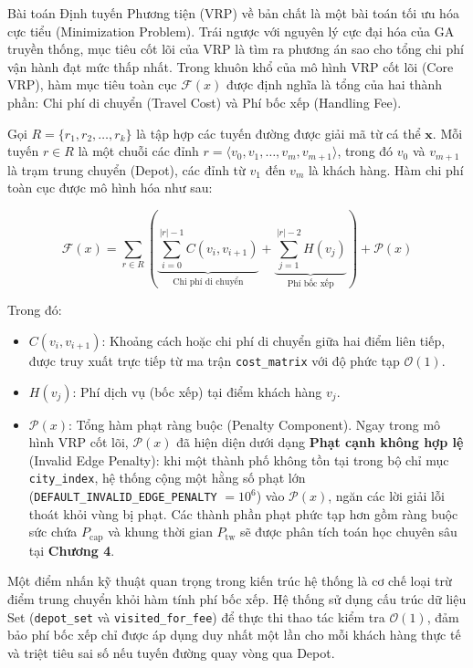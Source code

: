 \documentclass[12pt,a4paper]{article}
\numberwithin{figure}{subsection}
\begin{document}
Bài toán Định tuyến Phương tiện (VRP) về bản chất là một bài toán tối ưu hóa cực tiểu (Minimization Problem). Trái ngược với nguyên lý cực đại hóa của GA truyền thống, mục tiêu cốt lõi của VRP là tìm ra phương án sao cho tổng chi phí vận hành đạt mức thấp nhất. Trong khuôn khổ của mô hình VRP cốt lõi (Core VRP), hàm mục tiêu toàn cục $\mathcal{F}(x)$ được định nghĩa là tổng của hai thành phần: Chi phí di chuyển (Travel Cost) và Phí bốc xếp (Handling Fee).

Gọi $R = \{r_1, r_2, \dots, r_k\}$ là tập hợp các tuyến đường được giải mã từ cá thể $\textbf{x}$. Mỗi tuyến $r \in R$ là một chuỗi các đỉnh $r = \langle v_0, v_1, \dots, v_m, v_{m+1} \rangle$, trong đó $v_0$ và $v_{m+1}$ là trạm trung chuyển (Depot), các đỉnh từ $v_1$ đến $v_m$ là khách hàng. Hàm chi phí toàn cục được mô hình hóa như sau:

\[ \mathcal{F}(x) = \sum_{r \in R} \left( \underbrace{\sum_{i=0}^{|r|-1} C(v_i, v_{i+1})}_{\text{Chi phí di chuyển}} + \underbrace{\sum_{j=1}^{|r|-2} H(v_j)}_{\text{Phí bốc xếp}} \right) + \mathcal{P}(x) \]

Trong đó:
\begin{itemize}[label={ $\circ$}, leftmargin=1.5cm]
    \item $C(v_i, v_{i+1})$: Khoảng cách hoặc chi phí di chuyển giữa hai điểm liên tiếp, được truy xuất trực tiếp từ ma trận \texttt{cost\_matrix} với độ phức tạp $\mathcal{O}(1)$.
    \item $H(v_j)$: Phí dịch vụ (bốc xếp) tại điểm khách hàng $v_j$. 
    \item $\mathcal{P}(x)$: Tổng hàm phạt ràng buộc (Penalty Component). Ngay trong mô hình VRP cốt lõi, $\mathcal{P}(x)$ đã hiện diện dưới dạng \textbf{Phạt cạnh không hợp lệ} (Invalid Edge Penalty): khi một thành phố không tồn tại trong bộ chỉ mục \texttt{city\_index}, hệ thống cộng một hằng số phạt lớn (\texttt{DEFAULT\_INVALID\_EDGE\_PENALTY} $= 10^6$) vào $\mathcal{P}(x)$, ngăn các lời giải lỗi thoát khỏi vùng bị phạt. Các thành phần phạt phức tạp hơn gồm ràng buộc sức chứa $P_{\text{cap}}$ và khung thời gian $P_{\text{tw}}$ sẽ được phân tích toán học chuyên sâu tại \textbf{Chương 4}.
\end{itemize}

Một điểm nhấn kỹ thuật quan trọng trong kiến trúc hệ thống là cơ chế loại trừ điểm trung chuyển khỏi hàm tính phí bốc xếp. Hệ thống sử dụng cấu trúc dữ liệu Set (\texttt{depot\_set} và \texttt{visited\_for\_fee}) để thực thi thao tác kiểm tra $\mathcal{O}(1)$, đảm bảo phí bốc xếp chỉ được áp dụng duy nhất một lần cho mỗi khách hàng thực tế và triệt tiêu sai số nếu tuyến đường quay vòng qua Depot.
\end{document}
